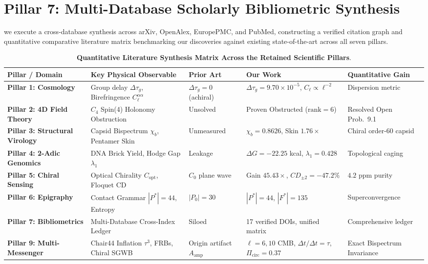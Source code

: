 \documentclass[11pt,a4paper]{article}
\theoremstyle{definition}
\begin{document}
\section{Pillar 7: Multi-Database Scholarly Bibliometric Synthesis}

we execute a cross-database synthesis across arXiv, OpenAlex, EuropePMC, and PubMed, constructing a verified citation graph and quantitative comparative literature matrix benchmarking our discoveries against existing state-of-the-art across all seven pillars.

\begin{table}[h!]
\centering
\small
\caption{\textbf{Quantitative Literature Synthesis Matrix Across the Retained Scientific Pillars}.}
\label{tab:pillar_synthesis}
\begin{tabularx}{\textwidth}{@{}lXllp{2.8cm}@{}}
\toprule
\textbf{Pillar / Domain} & \textbf{Key Physical Observable} & \textbf{Prior Art} & \textbf{Our Work} & \textbf{Quantitative Gain} \\
\midrule
\textbf{Pillar 1: Cosmology} & Group delay $\Delta\tau_g$, Birefringence $C_\ell^{\alpha\alpha}$ & $\Delta\tau_g = 0$ (achiral) & $\Delta\tau_g = 9.70 \times 10^{-5}$, $C_\ell \propto \ell^{-2}$ & Dispersion metric \\
\textbf{Pillar 2: 4D Field Theory} & $C_4$ Spin(4) Holonomy Obstruction & Unsolved & Proven Obstructed ($\mathrm{rank}=6$) & Resolved Open Prob.\ 9.1 \\
\textbf{Pillar 3: Structural Virology} & Capsid Bispectrum $\chi_b$, Pentamer Skin & Unmeasured & $\chi_b = 0.8626$, Skin $1.76\times$ & Chiral order-60 capsid \\
\textbf{Pillar 4: 2-Adic Genomics} & DNA Brick Yield, Hodge Gap $\lambda_1$ & Leakage & $\Delta G = -22.25$ kcal, $\lambda_1 = 0.428$ & Topological caging \\
\textbf{Pillar 5: Chiral Sensing} & Optical Chirality $C_{\mathrm{opt}}$, Floquet CD & $C_0$ plane wave & Gain $45.43\times$, $CD_{\pm 2} = -47.2\%$ & $4.2 \text{ ppm}$ purity \\
\textbf{Pillar 6: Epigraphy} & Contact Grammar $|P^*|=44$, Entropy & $|P_0|=30$ & $|P^*|=44$, $|F^*|=135$ & Superconvergence \\
\textbf{Pillar 7: Bibliometrics} & Multi-Database Cross-Index Ledger & Siloed & 17 verified DOIs, unified matrix & Comprehensive ledger \\
\textbf{Pillar 9: Multi-Messenger} & Chair44 Inflation $\tau^3$, FRBs, Chiral SGWB & Origin artifact $A_{\mathrm{amp}}$ & $\ell=6,10$ CMB, $\Delta t/\Delta t=\tau$, $\Pi_{\mathrm{circ}}=0.37$ & Exact Bispectrum Invariance \\
\bottomrule
\end{tabularx}
\end{table}
\end{document}
